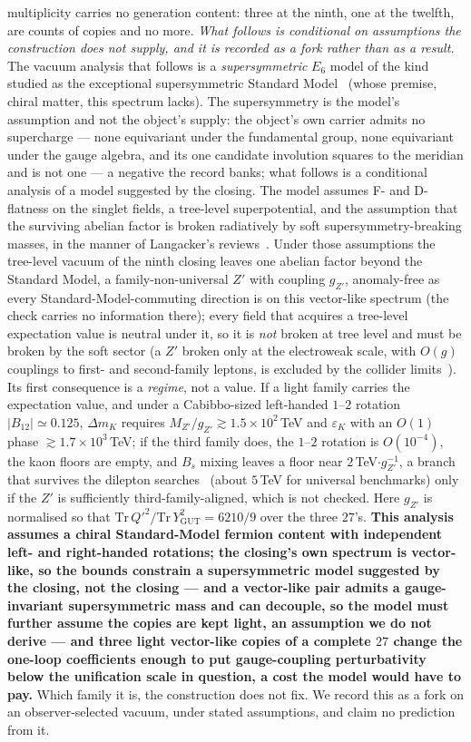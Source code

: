 \documentclass[11pt,a4paper]{article}
\theoremstyle{definition}
\theoremstyle{remark}
\begin{document}
multiplicity carries no generation content: three at the ninth, one at the twelfth, are counts of copies and no more. \emph{What follows is conditional on assumptions the construction does not supply, and it is recorded as a fork rather than as a result.} The vacuum analysis that follows is a \emph{supersymmetric} $E_6$ model of the kind studied as the exceptional supersymmetric Standard Model~\cite{kmn} (whose premise, chiral matter, this spectrum lacks). The supersymmetry is the model's assumption and not the object's supply: the object's own carrier admits no supercharge --- none equivariant under the fundamental group, none equivariant under the gauge algebra, and its one candidate involution squares to the meridian and is not one --- a negative the record banks; what follows is a conditional analysis of a model suggested by the closing. The model assumes F- and D-flatness on the singlet fields, a tree-level superpotential, and
the assumption that the surviving abelian factor is broken radiatively by soft supersymmetry-breaking masses, in the
manner of Langacker's reviews~\cite{lang,lp}. Under those assumptions the tree-level vacuum of the ninth closing leaves one
abelian factor beyond the Standard Model, a family-non-universal $Z'$ with coupling $g_{Z'}$, anomaly-free as every Standard-Model-commuting direction is on this
vector-like spectrum (the check carries no information there); every field that acquires a tree-level expectation value is neutral under it, so it is \emph{not} broken at tree level
and must be broken by the soft sector (a $Z'$ broken only at the electroweak scale, with $O(g)$ couplings to first- and second-family leptons, is excluded by the collider limits~\cite{atlasdilepton}). Its first consequence is a \emph{regime}, not a value. If a light family carries the expectation value, and
under a Cabibbo-sized left-handed $1$--$2$ rotation $|B_{12}| \simeq 0.125$, $\Delta m_K$ requires
$M_{Z'}/g_{Z'} \gtrsim 1.5 \times 10^2\,$TeV and $\varepsilon_K$ with an $O(1)$ phase $\gtrsim 1.7 \times 10^3\,$TeV; if the
third family does, the $1$--$2$ rotation is $O(10^{-4})$, the kaon floors are empty, and $B_s$ mixing leaves a floor near
$2\,$TeV$\cdot g_{Z'}^{-1}$, a branch that survives the dilepton searches~\cite{atlasdilepton} (about $5\,$TeV for universal
benchmarks) only if the $Z'$ is sufficiently third-family-aligned, which is not checked. Here $g_{Z'}$ is normalised so that
$\mathrm{Tr}\,Q'^2 / \mathrm{Tr}\,Y_{\mathrm{GUT}}^2 = 6210/9$ over the three $27$'s. \textbf{This analysis assumes a chiral
Standard-Model fermion content with independent left- and right-handed rotations; the closing's own spectrum is vector-like,
so the bounds constrain a supersymmetric model suggested by the closing, not the closing --- and a vector-like pair admits a gauge-invariant supersymmetric mass and can decouple, so the model must further assume the copies are kept light, an assumption we do not derive --- and three light vector-like copies of a complete $27$ change the one-loop coefficients enough to put gauge-coupling perturbativity below the unification scale in question, a cost the model would have to pay.} Which family it is, the construction
does not fix. We record this as a fork on an observer-selected vacuum, under stated assumptions, and claim no prediction from it.
\end{document}
